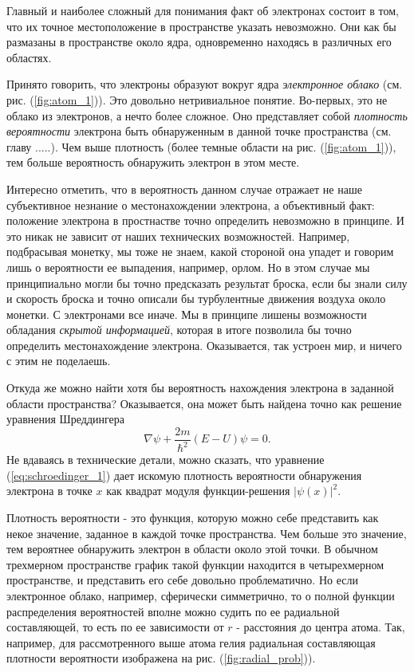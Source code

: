Главный и наиболее сложный для понимания факт об электронах состоит в том, что их точное местоположение в пространстве указать невозможно.
Они как бы размазаны в пространстве около ядра, одновременно находясь в различных его областях.

Принято говорить, что электроны образуют вокруг ядра \textit{электронное облако} (см. рис. (\ref{fig:atom_1})).
Это довольно нетривиальное понятие.
Во-первых, это не облако из электронов, а нечто более сложное.
Оно представляет собой \textit{плотность вероятности} электрона быть обнаруженным в данной точке пространства (см. главу .....).
Чем выше плотность (более темные области на рис. (\ref{fig:atom_1})), тем больше вероятность обнаружить электрон в этом месте.

Интересно отметить, что в вероятность данном случае отражает не наше субъективное незнание о местонахождении электрона, а объективный факт: положение электрона в простнастве точно определить невозможно в принципе.
И это никак не зависит от наших технических возможностей. 
Например, подбрасывая монетку, мы тоже не знаем, какой стороной она упадет и говорим лишь о вероятности ее выпадения, например, орлом.
Но в этом случае мы принципиально могли бы точно предсказать результат броска, если бы знали силу и скорость броска и точно описали бы турбулентные движения воздуха около монетки.
С электронами все иначе.
Мы в принципе лишены возможности обладания \textit{скрытой информацией}, которая в итоге позволила бы точно определить местонахождение электрона.
Оказывается, так устроен мир, и ничего с этим не поделаешь. 

Откуда же можно найти хотя бы вероятность нахождения электрона в заданной области пространства?
Оказывается, она может быть найдена точно как решение уравнения Шреддингера
\begin{equation}\label{eq:schroedinger_1}
\nabla\psi + \frac{2m}{\hbar^2}(E - U)\psi = 0.
\end{equation}
Не вдаваясь в технические детали, можно сказать, что уравнение (\ref{eq:schroedinger_1}) дает искомую плотность вероятности обнаружения электрона в точке $x$ как квадрат модуля функции-решения $|\psi(x)|^2$.

Плотность вероятности - это функция, которую можно себе представить как некое значение, заданное в каждой точке пространства.
Чем больше это значение, тем вероятнее обнаружить электрон в области около этой точки.
В обычном трехмерном пространстве график такой функции находится в четырехмерном пространстве, и представить его себе довольно проблематично.
Но если электронное облако, например, сферически симметрично, то о полной функции распределения вероятностей вполне можно судить по ее радиальной составляющей, то есть по ее зависимости от $r$ - расстояния до центра атома.
Так, например, для рассмотренного выше атома гелия радиальная составляющая плотности вероятности изображена на рис. (\ref{fig:radial_prob})).  

